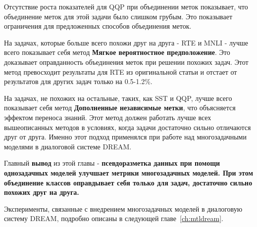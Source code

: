  Отсутствие роста показателей для QQP при объединении меток показывает, что объединение меток для этой задачи было слишком грубым. Это показывает ограничения для предложенных способов объединения меток.
 
На задачах, которые больше всего похожи друг на друга - RTE и MNLI - лучше всего показывает себя метод \textbf{Мягкое вероятностное предположение}. Это доказывает оправданность объединения меток при решении похожих задач. Этот метод превосходит результаты для RTE из оригинальной статьи и отстает от результатов для других задач только на 0.5-1.2\%.

На задачах, не похожих на остальные, таких, как SST и QQP, лучше всего показывает себя метод \textbf{Дополненные независимые метки}, что объясняется эффектом переноса знаний. Этот метод должен работать лучше всех вышеописанных методов в условиях, когда задачи достаточно сильно отличаются друг от друга. Именно этот подход применялся при работе над многозадачными моделями в диалоговой системе DREAM.

Главный \textbf{вывод} из этой главы - \textbf{псевдоразметка данных при помощи однозадачных моделей улучшает метрики многозадачных моделей. При этом объединение классов оправдывает себя только для задач, достаточно сильно похожих друг на друга.}

Эксперименты, связанные с внедрением многозадачных моделей в диалоговую систему DREAM, подробно описаны в следующей главе~\ref{ch:mtldream}.
